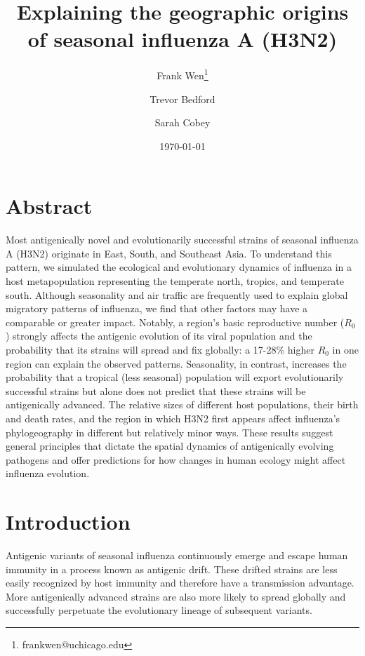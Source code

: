 \documentclass[10pt]{article}
\title{Explaining the geographic origins of seasonal influenza A (H3N2)}
\author[1]{Frank Wen\thanks{frankwen@uchicago.edu}}
\author[2]{Trevor Bedford}
\author[1]{Sarah Cobey}
\date{\today}
\affil[1]{Department of Ecology and Evolution, University of Chicago, 1101 E. 57th St., Chicago, IL 60637}
\affil[2]{Vaccine and Infectious Disease Division, Fred Hutchinson Cancer Research Center}
\begin{document}
\maketitle

\section{Abstract}
Most antigenically novel and evolutionarily successful strains of seasonal influenza A (H3N2) originate in East, South, and Southeast Asia. 
To understand this pattern, we simulated the ecological and evolutionary dynamics of influenza in a host metapopulation representing the temperate north, tropics, and temperate south. 
Although seasonality and air traffic are frequently used to explain global migratory patterns of influenza, we find that other factors may have a comparable or greater impact. 
Notably, a region's basic reproductive number ($R_0$) strongly affects the antigenic evolution of its viral population and the probability that its strains will spread and fix globally: a 17-28\% higher $R_0$ in one region can explain the observed patterns. 
Seasonality, in contrast, increases the probability that a tropical (less seasonal) population will export evolutionarily successful strains but alone does not predict that these strains will be antigenically advanced. 
The relative sizes of different host populations, their birth and death rates, and the region in which H3N2 first appears affect influenza's phylogeography in different but relatively minor ways. 
These results suggest general principles that dictate the spatial dynamics of antigenically evolving pathogens and offer predictions for how changes in human ecology might affect influenza evolution.

\section{Introduction}
Antigenic variants of seasonal influenza continuously emerge and escape human immunity in a process known as antigenic drift. 
These drifted strains are less easily recognized by host immunity and therefore have a transmission advantage.
More antigenically advanced strains are also more likely to spread globally and successfully perpetuate the evolutionary lineage of subsequent variants.
\end{document}

